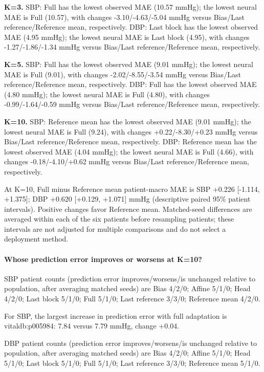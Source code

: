 \documentclass[11pt]{article}
\begin{document}
\textbf{K=3.} SBP: Full has the lowest observed MAE (10.57 mmHg); the lowest neural MAE is Full (10.57), with changes -3.10/-4.63/-5.04 mmHg versus Bias/Last reference/Reference mean, respectively. DBP: Last block has the lowest observed MAE (4.95 mmHg); the lowest neural MAE is Last block (4.95), with changes -1.27/-1.86/-1.34 mmHg versus Bias/Last reference/Reference mean, respectively.

\textbf{K=5.} SBP: Full has the lowest observed MAE (9.01 mmHg); the lowest neural MAE is Full (9.01), with changes -2.02/-8.55/-3.54 mmHg versus Bias/Last reference/Reference mean, respectively. DBP: Full has the lowest observed MAE (4.80 mmHg); the lowest neural MAE is Full (4.80), with changes -0.99/-1.64/-0.59 mmHg versus Bias/Last reference/Reference mean, respectively.

\textbf{K=10.} SBP: Reference mean has the lowest observed MAE (9.01 mmHg); the lowest neural MAE is Full (9.24), with changes +0.22/-8.30/+0.23 mmHg versus Bias/Last reference/Reference mean, respectively. DBP: Reference mean has the lowest observed MAE (4.04 mmHg); the lowest neural MAE is Full (4.66), with changes -0.18/-4.10/+0.62 mmHg versus Bias/Last reference/Reference mean, respectively.

At K=10, Full minus Reference mean patient-macro MAE is SBP +0.226 [-1.114, +1.375]; DBP +0.620 [+0.129, +1.071] mmHg (descriptive paired 95\% patient intervals). Positive changes favor Reference mean. Matched-seed differences are averaged within each of the six patients before resampling patients; these intervals are not adjusted for multiple comparisons and do not select a deployment method.

\paragraph{Whose prediction error improves or worsens at K=10?}

SBP patient counts (prediction error improves/worsens/is unchanged relative to population, after averaging matched seeds) are Bias 4/2/0; Affine 5/1/0; Head 4/2/0; Last block 5/1/0; Full 5/1/0; Last reference 3/3/0; Reference mean 4/2/0.

For SBP, the largest increase in prediction error with full adaptation is vitaldb:p005984: 7.84 versus 7.79 mmHg, change +0.04.

DBP patient counts (prediction error improves/worsens/is unchanged relative to population, after averaging matched seeds) are Bias 4/2/0; Affine 5/1/0; Head 5/1/0; Last block 5/1/0; Full 5/1/0; Last reference 3/3/0; Reference mean 5/1/0.
\end{document}
